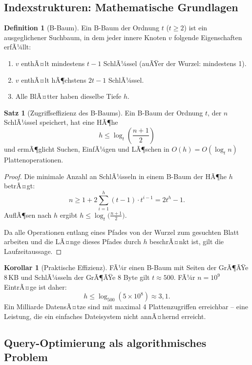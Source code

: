 ﻿\documentclass[a4paper,12pt]{article}
\theoremstyle{definition}
\newtheorem{definition}{Definition}
\newtheorem{satz}{Satz}
\newtheorem{korollar}{Korollar}
\begin{document}
\subsection{Indexstrukturen: Mathematische Grundlagen}

\begin{definition}[B-Baum]
\label{def:bbaum}
Ein B-Baum der Ordnung $t$ ($t \geq 2$) ist ein ausgeglichener Suchbaum, in dem jeder innere Knoten $v$ folgende Eigenschaften erfÃ¼llt:
\begin{enumerate}
	\item $v$ enthÃ¤lt mindestens $t-1$ SchlÃ¼ssel (auÃŸer der Wurzel: mindestens 1).
	\item $v$ enthÃ¤lt hÃ¶chstens $2t-1$ SchlÃ¼ssel.
	\item Alle BlÃ¤tter haben dieselbe Tiefe $h$.
\end{enumerate}
\end{definition}

\begin{satz}[Zugriffseffizienz des B-Baums]
\label{satz:bbaum}
Ein B-Baum der Ordnung $t$, der $n$ SchlÃ¼ssel speichert, hat eine HÃ¶he
\[
h \leq \log_t \!\left(\frac{n+1}{2}\right)
\]
und ermÃ¶glicht Suchen, EinfÃ¼gen und LÃ¶schen in $O(h) = O(\log_t n)$ Plattenoperationen.
\end{satz}

\begin{proof}
Die minimale Anzahl an SchlÃ¼sseln in einem B-Baum der HÃ¶he $h$ betrÃ¤gt:
\[
n \geq 1 + 2 \sum_{i=1}^{h}(t-1) \cdot t^{i-1} = 2t^h - 1.
\]
AuflÃ¶sen nach $h$ ergibt $h \leq \log_t\!\bigl(\frac{n+1}{2}\bigr)$.

Da alle Operationen entlang eines Pfades von der Wurzel zum gesuchten Blatt arbeiten und die LÃ¤nge dieses Pfades durch $h$ beschrÃ¤nkt ist, gilt die Laufzeitaussage.
\end{proof}

\begin{korollar}[Praktische Effizienz]
\label{kor:effizienz}
FÃ¼r einen B-Baum mit Seiten der GrÃ¶ÃŸe 8\,KB und SchlÃ¼sseln der GrÃ¶ÃŸe 8 Byte gilt $t \approx 500$. FÃ¼r $n = 10^9$ EintrÃ¤ge ist daher:
\[
h \leq \log_{500}(5 \times 10^8) \approx 3{,}1.
\]
Ein Milliarde DatensÃ¤tze sind mit maximal 4 Plattenzugriffen erreichbar -- eine Leistung, die ein einfaches Dateisystem nicht annÃ¤hernd erreicht.
\end{korollar}

\subsection{Query-Optimierung als algorithmisches Problem}
\end{document}
